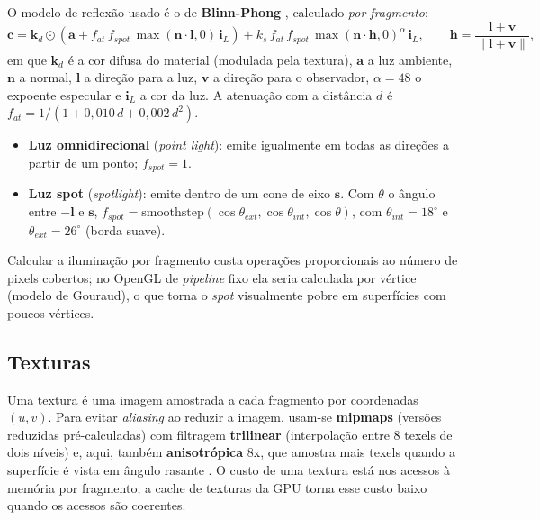 \documentclass[12pt,a4paper]{article}
\begin{document}
O modelo de reflexão usado é o de \textbf{Blinn-Phong} \cite{blinn,phong}, calculado
\emph{por fragmento}:
\begin{equation}
  \mathbf{c} = \mathbf{k}_d \odot \left(\mathbf{a} + f_{at}\, f_{spot}\, \max(\mathbf{n}\cdot\mathbf{l},0)\, \mathbf{i}_L\right)
             + k_s\, f_{at}\, f_{spot}\, \max(\mathbf{n}\cdot\mathbf{h},0)^{\alpha}\, \mathbf{i}_L,
  \qquad \mathbf{h} = \frac{\mathbf{l}+\mathbf{v}}{\lVert\mathbf{l}+\mathbf{v}\rVert},
  \label{eq:blinn}
\end{equation}
em que $\mathbf{k}_d$ é a cor difusa do material (modulada pela textura), $\mathbf{a}$ a luz
ambiente, $\mathbf{n}$ a normal, $\mathbf{l}$ a direção para a luz, $\mathbf{v}$ a direção para o
observador, $\alpha=48$ o expoente especular e $\mathbf{i}_L$ a cor da luz. A atenuação com a
distância $d$ é $f_{at}=1/(1+0{,}010\,d+0{,}002\,d^2)$.
\begin{itemize}
  \item \textbf{Luz omnidirecional} (\emph{point light}): emite igualmente em todas as direções a
        partir de um ponto; $f_{spot}=1$.
  \item \textbf{Luz spot} (\emph{spotlight}): emite dentro de um cone de eixo $\mathbf{s}$. Com
        $\theta$ o ângulo entre $-\mathbf{l}$ e $\mathbf{s}$,
        $f_{spot}=\mathrm{smoothstep}(\cos\theta_{ext},\cos\theta_{int},\cos\theta)$, com
        $\theta_{int}=18^\circ$ e $\theta_{ext}=26^\circ$ (borda suave).
\end{itemize}
Calcular a iluminação por fragmento custa operações proporcionais ao número de pixels cobertos;
no OpenGL de \emph{pipeline} fixo ela seria calculada por vértice (modelo de Gouraud), o que
torna o \emph{spot} visualmente pobre em superfícies com poucos vértices.

\subsection{Texturas}

Uma textura é uma imagem amostrada a cada fragmento por coordenadas $(u,v)$. Para evitar
\emph{aliasing} ao reduzir a imagem, usam-se \textbf{mipmaps} (versões reduzidas pré-calculadas)
com filtragem \textbf{trilinear} (interpolação entre 8 texels de dois níveis) e, aqui, também
\textbf{anisotrópica} 8x, que amostra mais texels quando a superfície é vista em ângulo rasante
\cite{akenine,williams}. O custo de uma textura está nos acessos à memória por fragmento;
a cache de texturas da GPU torna esse custo baixo quando os acessos são coerentes.
\end{document}
